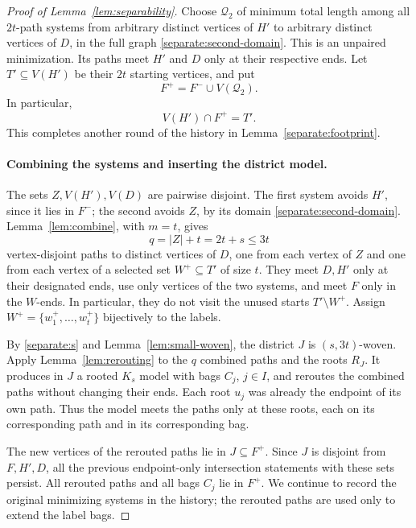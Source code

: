 \begin{proof}[Proof of Lemma~\ref{lem:separability}]
Choose \(\mathcal Q_2\) of minimum total length among all
\(2t\)-path systems from arbitrary distinct vertices of \(H'\)
to arbitrary distinct vertices of \(D\), in the full graph
\eqref{separate:second-domain}. This is an unpaired minimization.
Its paths meet \(H'\) and \(D\) only at their respective ends.
Let \(T'\subseteq V(H')\) be their \(2t\) starting vertices, and put
\[
 F^+=F^-\cup V(\mathcal Q_2).
\]
In particular,
\begin{equation}
 \label{separate:region-footprint}
 V(H')\cap F^+=T'.
\end{equation}
This completes another round of the history in
Lemma~\ref{separate:footprint}.

\paragraph{Combining the systems and inserting the district model.}
The sets \(Z,V(H'),V(D)\) are pairwise disjoint.
The first system avoids \(H'\), since it lies in \(F^-\);
the second avoids \(Z\), by its domain \eqref{separate:second-domain}.
Lemma~\ref{lem:combine}, with \(m=t\), gives
\[
 q=|Z|+t=2t+s\le3t
\]
vertex-disjoint paths to distinct vertices of \(D\), one from
each vertex of \(Z\) and one from each vertex of a selected
set \(W^+\subseteq T'\) of size \(t\).
They meet \(D,H'\) only at their designated ends, use only vertices
of the two systems, and meet \(F\) only in the \(W\)-ends.
In particular, they do not visit the unused starts \(T'\setminus W^+\).
Assign \(W^+=\{w_1^+,\ldots,w_t^+\}\) bijectively to the labels.

By \eqref{separate:s} and Lemma~\ref{lem:small-woven}, the district
\(J\) is \((s,3t)\)-woven. Apply Lemma~\ref{lem:rerouting} to
the \(q\) combined paths and the roots \(R_J\). It produces in \(J\)
a rooted \(K_s\) model with bags \(C_j\), \(j\in I\), and
reroutes the combined paths without changing their ends.
Each root \(u_j\) was already the endpoint of its own path.
Thus the model meets the paths only at these roots, each on
its corresponding path and in its corresponding bag.

The new vertices of the rerouted paths lie in \(J\subseteq F^+\).
Since \(J\) is disjoint from \(F,H',D\), all the previous
endpoint-only intersection statements with these sets persist.
All rerouted paths and all bags \(C_j\) lie in \(F^+\).
We continue to record the original minimizing systems in the
history; the rerouted paths are used only to extend the label bags.


\end{proof}

